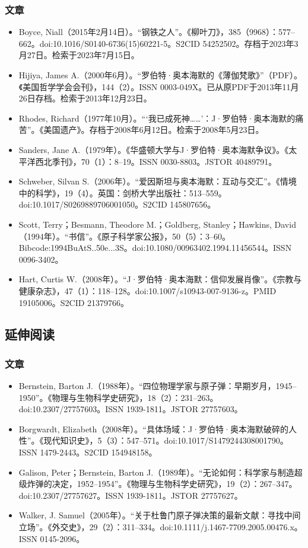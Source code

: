 \subsubsection{文章}
\begin{itemize}
\item Boyce, Niall（2015年2月14日）。“钢铁之人”。《柳叶刀》，385（9968）：577–662。doi:10.1016/S0140-6736(15)60221-5。S2CID 54252502。存档于2023年3月27日。检索于2023年7月15日。
\item Hijiya, James A.（2000年6月）。“罗伯特·奥本海默的《薄伽梵歌》”（PDF）。《美国哲学学会会刊》，144（2）。ISSN 0003-049X。已从原PDF于2013年11月26日存档。检索于2013年12月23日。
\item Rhodes, Richard（1977年10月）。“‘我已成死神……’：J·罗伯特·奥本海默的痛苦”。《美国遗产》。存档于2008年6月12日。检索于2008年5月23日。
\item Sanders, Jane A.（1979年）。《华盛顿大学与J·罗伯特·奥本海默争议》。《太平洋西北季刊》，70（1）：8–19。ISSN 0030-8803。JSTOR 40489791。
\item Schweber, Silvan S.（2006年）。“爱因斯坦与奥本海默：互动与交汇”。《情境中的科学》，19（4）。英国：剑桥大学出版社：513–559。doi:10.1017/S0269889706001050。S2CID 145807656。
\item Scott, Terry；Besmann, Theodore M.；Goldberg, Stanley；Hawkins, David（1994年）。“书信”。《原子科学家公报》，50（5）：3–60。Bibcode:1994BuAtS..50e...3S。doi:10.1080/00963402.1994.11456544。ISSN 0096-3402。
\item Hart, Curtis W.（2008年）。“J·罗伯特·奥本海默：信仰发展肖像”。《宗教与健康杂志》，47（1）：118–128。doi:10.1007/s10943-007-9136-z。PMID 19105006。S2CID 21379766。
\end{itemize}
\subsection{延伸阅读}
\subsubsection{文章}
\begin{itemize}
\item Bernstein, Barton J.（1988年）。“四位物理学家与原子弹：早期岁月，1945–1950”。《物理与生物科学史研究》，18（2）：231–263。doi:10.2307/27757603。ISSN 1939-1811。JSTOR 27757603。
\item Borgwardt, Elizabeth（2008年）。“具体场域：J·罗伯特·奥本海默破碎的人性”。《现代知识史》，5（3）：547–571。doi:10.1017/S1479244308001790。ISSN 1479-2443。S2CID 154948158。
\item Galison, Peter；Bernstein, Barton J.（1989年）。“无论如何：科学家与制造超级炸弹的决定，1952–1954”。《物理与生物科学史研究》，19（2）：267–347。doi:10.2307/27757627。ISSN 1939-1811。JSTOR 27757627。
\item Walker, J. Samuel（2005年）。“关于杜鲁门原子弹决策的最新文献：寻找中间立场”。《外交史》，29（2）：311–334。doi:10.1111/j.1467-7709.2005.00476.x。ISSN 0145-2096。
\end{itemize}
